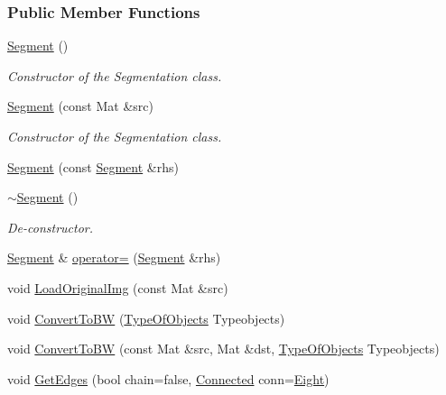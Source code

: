 \subsubsection*{Public Member Functions}
\begin{DoxyCompactItemize}
\item 
\hyperlink{class_vision_1_1_segment_adfe9fc7ffcc7269f961d4b1f6720d1e8}{Segment} ()
\begin{DoxyCompactList}\small\item\em Constructor of the Segmentation class. \end{DoxyCompactList}\item 
\hyperlink{class_vision_1_1_segment_ad3c4765e0e519f8d5fc7ac2e567608ee}{Segment} (const Mat \&src)
\begin{DoxyCompactList}\small\item\em Constructor of the Segmentation class. \end{DoxyCompactList}\item 
\hyperlink{class_vision_1_1_segment_a365b40b1f7886344c063c881c5cd27ca}{Segment} (const \hyperlink{class_vision_1_1_segment}{Segment} \&rhs)
\item 
\hyperlink{class_vision_1_1_segment_a76b45a453304f1f485e3bc2fcad58b59}{$\sim$\+Segment} ()
\begin{DoxyCompactList}\small\item\em De-\/constructor. \end{DoxyCompactList}\item 
\hyperlink{class_vision_1_1_segment}{Segment} \& \hyperlink{class_vision_1_1_segment_a1bfc12c503f6e07cca595ec884273e13}{operator=} (\hyperlink{class_vision_1_1_segment}{Segment} \&rhs)
\item 
void \hyperlink{class_vision_1_1_segment_a8b5edc7f5a69d961e47f61a2191b8745}{Load\+Original\+Img} (const Mat \&src)
\item 
void \hyperlink{class_vision_1_1_segment_a4272ceb22f9cb20c6f65d9536149d3c0}{Convert\+To\+B\+W} (\hyperlink{class_vision_1_1_segment_ac3ddf2c72ee6333007510b680db1e7dd}{Type\+Of\+Objects} Typeobjects)
\item 
void \hyperlink{class_vision_1_1_segment_a513af00e29683fa172ce1844ffd7f98f}{Convert\+To\+B\+W} (const Mat \&src, Mat \&dst, \hyperlink{class_vision_1_1_segment_ac3ddf2c72ee6333007510b680db1e7dd}{Type\+Of\+Objects} Typeobjects)
\item 
void \hyperlink{class_vision_1_1_segment_ad002015511d2d8a4d42106c14e163623}{Get\+Edges} (bool chain=false, \hyperlink{class_vision_1_1_segment_a330240c08320e72270fac0aa83d5e27e}{Connected} conn=\hyperlink{class_vision_1_1_segment_a330240c08320e72270fac0aa83d5e27eae8e2b0fa6d15448f10cddc0390284a39}{Eight})

\end{DoxyCompactItemize}
